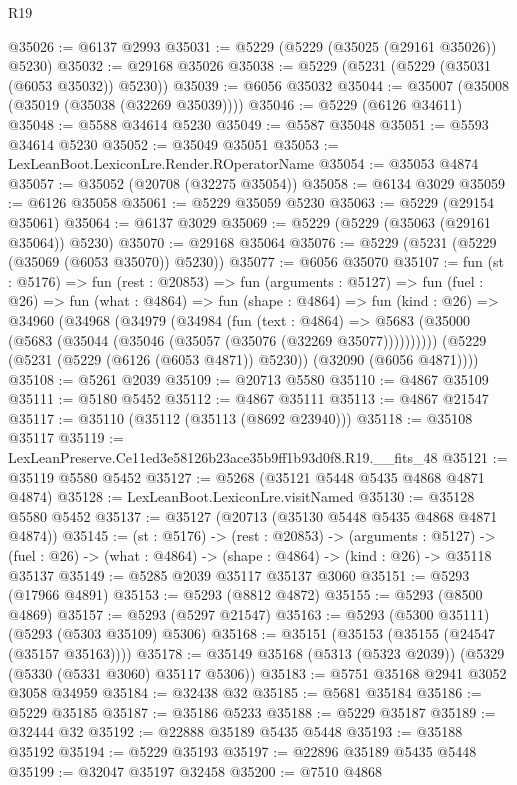 \begin{lexlean}{R19}
\begin{coremodule}
@35026 := @6137 @2993
@35031 := @5229 (@5229 (@35025 (@29161 @35026)) @5230)
@35032 := @29168 @35026
@35038 := @5229 (@5231 (@5229 (@35031 (@6053 @35032)) @5230))
@35039 := @6056 @35032
@35044 := @35007 (@35008 (@35019 (@35038 (@32269 @35039))))
@35046 := @5229 (@6126 @34611)
@35048 := @5588 @34614 @5230
@35049 := @5587 @35048
@35051 := @5593 @34614 @5230
@35052 := @35049 @35051
@35053 := LexLeanBoot.LexiconLre.Render.ROperatorName
@35054 := @35053 @4874
@35057 := @35052 (@20708 (@32275 @35054))
@35058 := @6134 @3029
@35059 := @6126 @35058
@35061 := @5229 @35059 @5230
@35063 := @5229 (@29154 @35061)
@35064 := @6137 @3029
@35069 := @5229 (@5229 (@35063 (@29161 @35064)) @5230)
@35070 := @29168 @35064
@35076 := @5229 (@5231 (@5229 (@35069 (@6053 @35070)) @5230))
@35077 := @6056 @35070
@35107 := fun (st : @5176) =>
  fun (rest : @20853) =>
  fun (arguments : @5127) =>
  fun (fuel : @26) =>
  fun (what : @4864) =>
  fun (shape : @4864) =>
  fun (kind : @26) =>
  @34960
    (@34968
      (@34979
        (@34984
          (fun (text : @4864) =>
          @5683 (@35000 (@5683 (@35044 (@35046 (@35057 (@35076 (@32269 @35077))))))))))
      (@5229 (@5231 (@5229 (@6126 (@6053 @4871)) @5230)) (@32090 (@6056 @4871))))
@35108 := @5261 @2039
@35109 := @20713 @5580
@35110 := @4867 @35109
@35111 := @5180 @5452
@35112 := @4867 @35111
@35113 := @4867 @21547
@35117 := @35110 (@35112 (@35113 (@8692 @23940)))
@35118 := @35108 @35117
@35119 := LexLeanPreserve.Ce11ed3e58126b23ace35b9ff1b93d0f8.R19.__fits_48
@35121 := @35119 @5580 @5452
@35127 := @5268 (@35121 @5448 @5435 @4868 @4871 @4874)
@35128 := LexLeanBoot.LexiconLre.visitNamed
@35130 := @35128 @5580 @5452
@35137 := @35127 (@20713 (@35130 @5448 @5435 @4868 @4871 @4874))
@35145 := (st : @5176) ->
  (rest : @20853) ->
  (arguments : @5127) ->
  (fuel : @26) -> (what : @4864) -> (shape : @4864) -> (kind : @26) -> @35118 @35137
@35149 := @5285 @2039 @35117 @35137 @3060
@35151 := @5293 (@17966 @4891)
@35153 := @5293 (@8812 @4872)
@35155 := @5293 (@8500 @4869)
@35157 := @5293 (@5297 @21547)
@35163 := @5293 (@5300 @35111) (@5293 (@5303 @35109) @5306)
@35168 := @35151 (@35153 (@35155 (@24547 (@35157 @35163))))
@35178 := @35149 @35168 (@5313 (@5323 @2039)) (@5329 (@5330 (@5331 @3060) @35117 @5306))
@35183 := @5751 @35168 @2941 @3052 @3058 @34959
@35184 := @32438 @32
@35185 := @5681 @35184
@35186 := @5229 @35185
@35187 := @35186 @5233
@35188 := @5229 @35187
@35189 := @32444 @32
@35192 := @22888 @35189 @5435 @5448
@35193 := @35188 @35192
@35194 := @5229 @35193
@35197 := @22896 @35189 @5435 @5448
@35199 := @32047 @35197 @32458
@35200 := @7510 @4868

\end{coremodule}
\end{lexlean}
